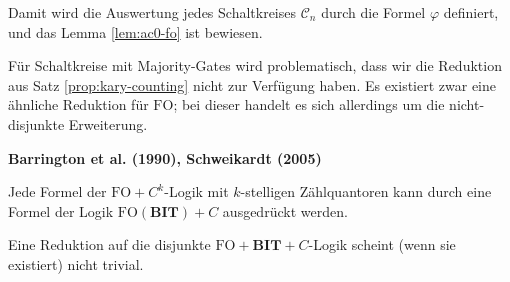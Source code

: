 Damit wird die Auswertung jedes Schaltkreises $\mathcal{C}_{n}$ durch
die Formel $\varphi$ definiert, und das Lemma \ref{lem:ac0-fo} ist
bewiesen.

Für Schaltkreise mit Majority-Gates wird problematisch, dass wir die
Reduktion aus Satz \ref{prop:kary-counting} nicht zur Verfügung haben.
Es existiert zwar eine ähnliche Reduktion für $\mathrm{FO}$; bei
dieser handelt es sich allerdings um die nicht-disjunkte Erweiterung.
\begin{prop}
\textbf{Barrington et al. (1990)\cite{Mix-Barrington:1990:UWN:95665.95674},
Schweikardt (2005)}\cite{Schweikardt:2005:AFL:1071596.1071602}

Jede Formel der $\mathrm{FO}+C^{k}$-Logik mit $k$-stelligen Zählquantoren
kann durch eine Formel der Logik $\mathrm{FO}\left(\mathbf{BIT}\right)+C$
ausgedrückt werden.
\end{prop}
Eine Reduktion auf die disjunkte $\mathrm{FO}+\mathbf{BIT}+C$-Logik
scheint (wenn sie existiert) nicht trivial.
